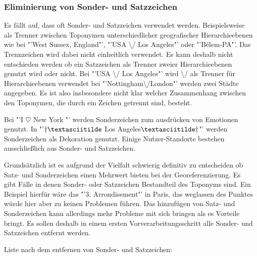			\subsubsection{Eliminierung von Sonder- und Satzzeichen} 

				Es fällt auf, dass oft Sonder- und Satzzeichen verwendet werden. 
				Beispielsweise als Trenner zwischen Toponymen unterschiedlicher geografischer Hierarchieebenen wie bei "'West Sussex, England"', "'USA \textbackslash/ Los Angeles"' oder "'Bélem-PA"'.
				Das Trennzeichen wird dabei nicht einheitlich verwendet.  
				Es kann deshalb nicht entschieden werden ob ein Satzzeichen als Trenner zweier Hierarchieebenen genutzt wird oder nicht.
				Bei "'USA \textbackslash/ Los Angeles"' wird \textbackslash/ als Trenner für Hierarchieebenen verwendet bei "'Nottingham\textbackslash/London"' werden zwei Städte angegeben.
				Es ist also insbesondere nicht klar welcher Zusammenhang zwischen den Toponymen, die durch ein Zeichen getrennt sind, besteht. 

				Bei "'I $\heartsuit$ New York "' werden Sonderzeichen zum ausdrücken von Emotionen genutzt.
				In "'$\dagger\textasciitilde$ Los Angeles$\textasciitilde\dagger$"' werden Sonderzeichen als Dekoration genutzt.
				Einige Nutzer-Standorte bestehen ausschließlich aus Sonder- und Satzzeichen.
				
				Grundsätzlich ist es aufgrund der Vielfalt schwierig definitiv zu entscheiden ob Satz- und Sonderzeichen einen Mehrwert bieten bei der Georeferenzierung. 
				Es gibt Fälle in denen Sonder- oder Satzzeichen Bestandteil des Toponyms sind.
				Ein Beispiel hierfür wäre das "'3. Arrondisement"' in Paris, das weglassen des Punktes würde hier aber zu keinen Problemen führen.
				Das hinzufügen von Satz- und Sonderzeichen kann allerdings mehr Probleme mit sich bringen als es Vorteile bringt.
				Es sollen deshalb in einem ersten Vorverarbeitungsschritt alle Sonder- und Satzzeichen entfernt werden. 

				Liste nach dem entfernen von Sonder- und Satzzeichen:


